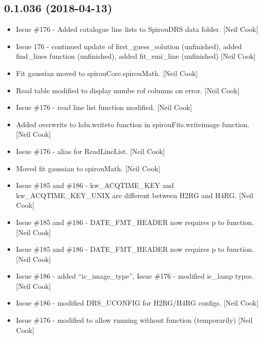 \documentclass[a4paper,10pt,english]{report}
\begin{document}
\subsection{0.1.036 (2018-04-13)}
\label{\detokenize{misc/changelog:id461}}\begin{itemize}
\item {} 
Issue \#176 - Added catalogue line lists to SpirouDRS data folder.
{[}Neil Cook{]}

\item {} 
Issue 176 - continued update of first\_guess\_solution (unfinished),
added find\_lines function (unfinished), added fit\_emi\_line
(unfinished) {[}Neil Cook{]}

\item {} 
Fit gaussian moved to spirouCore.spirouMath. {[}Neil Cook{]}

\item {} 
Read table modified to display numbe rof columns on error. {[}Neil Cook{]}

\item {} 
Issue \#176 - read line list function modified. {[}Neil Cook{]}

\item {} 
Added overwrite to hdu.writeto function in spirouFits.writeimage
function. {[}Neil Cook{]}

\item {} 
Issue \#176 - alias for ReadLineList. {[}Neil Cook{]}

\item {} 
Moved fit gaussian to spirouMath. {[}Neil Cook{]}

\item {} 
Issue \#185 and \#186 - kw\_ACQTIME\_KEY and kw\_ACQTIME\_KEY\_UNIX are
different between H2RG and H4RG. {[}Neil Cook{]}

\item {} 
Issue \#185 and \#186 - DATE\_FMT\_HEADER now requires p to function.
{[}Neil Cook{]}

\item {} 
Issue \#185 and \#186 - DATE\_FMT\_HEADER now requires p to function.
{[}Neil Cook{]}

\item {} 
Issue \#186 - added “ic\_image\_type”, Issue \#176 - modified ic\_lamp
types. {[}Neil Cook{]}

\item {} 
Issue \#186 - modified DRS\_UCONFIG for H2RG/H4RG configs. {[}Neil Cook{]}

\item {} 
Issue \#176 - modified to allow running without function (temporarily)
{[}Neil Cook{]}

\end{itemize}
\end{document}

